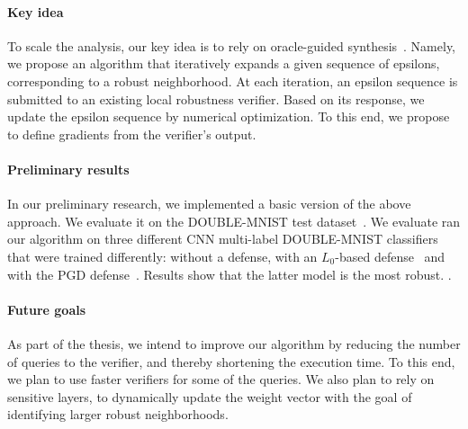 \paragraph{Key idea} To scale the analysis, our key idea is to rely on oracle-guided synthesis~\cite{OracleGuided}.
Namely, we propose an algorithm that iteratively expands a given sequence of epsilons, corresponding to a robust neighborhood.
At each iteration, an epsilon sequence is submitted to an existing local robustness verifier. %
Based on its response, we update the epsilon sequence by numerical optimization.
To this end, we propose to define gradients from the verifier's output. %

\paragraph{Preliminary results}
In our preliminary research, we implemented a basic version of the above approach.
We evaluate it on the DOUBLE-MNIST test dataset~\cite{DoubleMNIST}.
We evaluate ran our algorithm on three different CNN multi-label DOUBLE-MNIST classifiers that were trained differently: without a defense, with an $L_0$-based defense~\cite{L0} and with the PGD defense~\cite{PGD}.
Results show that the latter model is the most robust. %
.
\paragraph{Future goals}
As part of the thesis, we intend to improve our algorithm by reducing the number of queries to the verifier, and thereby shortening the execution time.
To this end, we plan to use faster verifiers for some of the queries. %
We also plan to rely on sensitive layers, to dynamically update the weight vector with the goal of identifying larger robust neighborhoods. %

